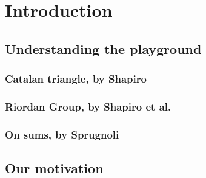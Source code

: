 
\chapter{Introduction}

\section{Understanding the playground}

\subsection{Catalan triangle, by Shapiro}


\subsection{Riordan Group, by Shapiro et al.}
\subsection{On sums, by Sprugnoli}


\section{Our motivation}
